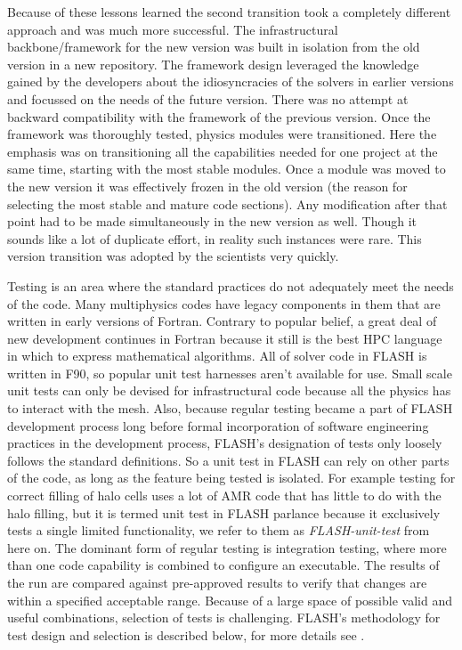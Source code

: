 Because of these lessons learned the second transition took a
completely different approach and was much more successful. The
infrastructural backbone/framework for the new version was built in
isolation from the old version in a new repository. The framework design
leveraged the knowledge gained by the developers about the
idiosyncracies of the solvers in earlier versions and focussed on
the needs of the future version. There was no attempt at backward
compatibility with the framework of the previous version. Once the
framework was thoroughly tested, physics modules were
transitioned. Here the emphasis was on transitioning all the
capabilities needed for one project at the same time, starting with
the most stable modules. Once a module was moved to the new version it
was effectively frozen in the old version (the reason for selecting
the most stable and mature code sections). Any modification after that
point had to be made simultaneously in the new version as well. Though
it sounds like a lot of duplicate effort, in reality such instances
were rare. This version transition was adopted by the scientists very quickly.

Testing is an area where the standard practices do not adequately
meet the needs of the code. Many multiphysics codes have legacy
components in them that are written in early versions of
Fortran. Contrary to popular belief, a great deal of new development
continues in Fortran because it still is the best HPC language
in which to express mathematical algorithms. All of solver code in
FLASH is written in F90, so popular unit test harnesses aren't available for
use. Small scale unit tests can only be devised for infrastructural
code because all the physics has to interact with the mesh. Also,
because regular testing became a part of FLASH development process
long before formal incorporation of software engineering practices in
the development process, FLASH's designation of tests only loosely follows the
standard definitions. So a unit test in FLASH can rely on other parts
of the code, as long as the feature being tested is isolated. For
example testing for correct filling of halo cells uses a lot of AMR
code that has little to do with the halo filling, but it is termed
unit test in FLASH parlance because it exclusively tests a single
limited functionality, we refer to them as {\em FLASH-unit-test} from
here on. The dominant form of regular testing is
integration testing, where more than one code capability is combined to
configure an executable. The results of the run are compared against
pre-approved results to verify that changes are within a specified
acceptable range. Because of a large space of possible valid and
useful combinations, selection of tests is challenging. FLASH's
methodology for test design and selection is described below, for more
details see \cite{Dubey2015}.

